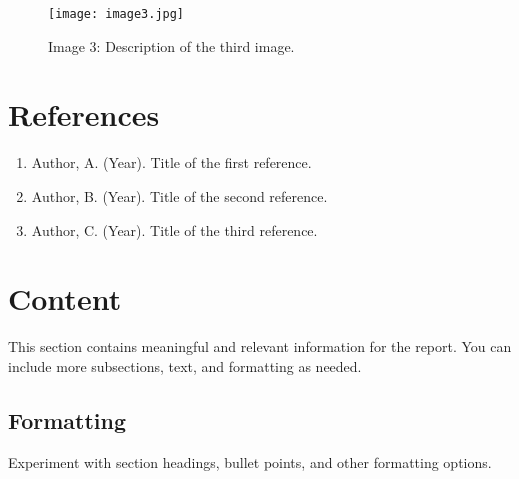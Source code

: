 \documentclass[letterpaper, 12pt]{article}
\begin{document}
    \begin{figure}[ht]
        \centering
        \texttt{[image: image3.jpg]}
        \caption{Image 3: Description of the third image.}
        \label{fig:image3}
    \end{figure}
    

        
    \section{References}
    \begin{enumerate}
        \item Author, A. (Year). Title of the first reference.
        \item Author, B. (Year). Title of the second reference.
        \item Author, C. (Year). Title of the third reference.
    \end{enumerate}
    

        
    \section{Content}
    This section contains meaningful and relevant information for the report. You can include more subsections, text, and formatting as needed.
    

        
    \subsection{Formatting}
    Experiment with section headings, bullet points, and other formatting options.
    

    
\end{document}
